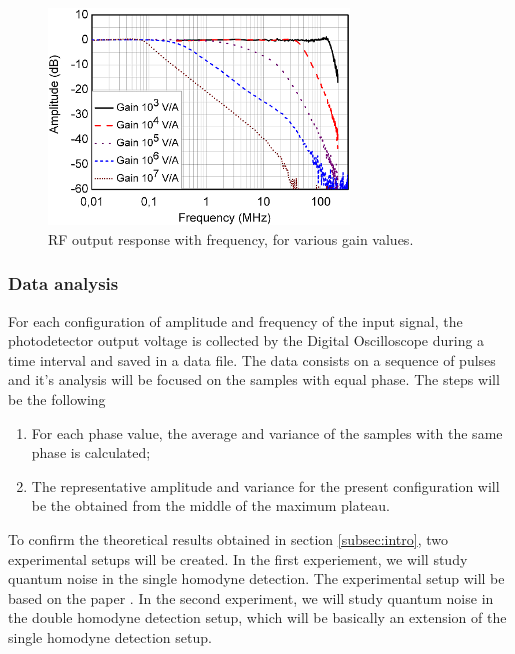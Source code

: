 %
\begin{figure}[H]
	\centering
	\includegraphics[width=8cm]{./sdf/optical_detection/figures/thorlabs-manual-gain-spec-rf.png}
	\caption{RF output response with frequency, for various gain values. \cite{thorlabs}}
	\label{plot:freq-response-rf}
\end{figure}
%
%
\subsubsection{Data analysis}
%
For each configuration of amplitude and frequency of the input signal, the photodetector output voltage is collected by the Digital Oscilloscope during a time interval and saved in a data file. The data consists on a sequence of pulses and it's analysis will be focused on the samples with equal phase. The steps will be the following
%
\begin{enumerate}
\item For each phase value, the average and variance of the samples with the same phase is calculated;
\item The representative amplitude and variance for the present configuration will be the obtained from the middle of the maximum plateau.
\end{enumerate}
%
%
%
%
To confirm the theoretical results obtained in section \ref{subsec:intro}, two experimental setups will be created. In the first experiement, we will study quantum noise in the single homodyne detection. The experimental setup will be based on the paper \cite{chi2011balanced}. In the second experiment, we will study quantum noise in the double homodyne detection setup, which will be basically an extension of the single homodyne detection setup.\\
\\
